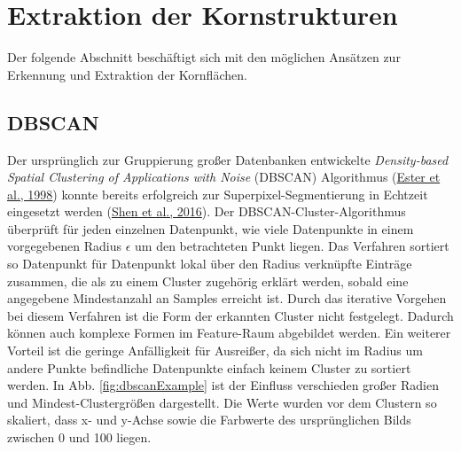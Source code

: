 \documentclass[
  12pt,
  openany]{book}
\begin{document}
\hypertarget{extraktion-der-kornstrukturen}{%
\section{Extraktion der Kornstrukturen}\label{extraktion-der-kornstrukturen}}

Der folgende Abschnitt beschäftigt sich mit den möglichen Ansätzen zur Erkennung und Extraktion der Kornflächen.

\hypertarget{dbscan}{%
\subsection{DBSCAN}\label{dbscan}}

Der ursprünglich zur Gruppierung großer Datenbanken entwickelte \emph{Density-based Spatial Clustering of Applications with Noise} (DBSCAN) Algorithmus (\protect\hyperlink{ref-esterIncrementalClusteringMining1998}{Ester et al., 1998}) konnte bereits erfolgreich zur Superpixel-Segmentierung in Echtzeit eingesetzt werden (\protect\hyperlink{ref-shenRealTimeSuperpixelSegmentation2016}{Shen et al., 2016}).
Der DBSCAN-Cluster-Algorithmus überprüft für jeden einzelnen Datenpunkt, wie viele Datenpunkte in einem vorgegebenen Radius \(\epsilon\) um den betrachteten Punkt liegen. Das Verfahren sortiert so Datenpunkt für Datenpunkt lokal über den Radius verknüpfte Einträge zusammen, die als zu einem Cluster zugehörig erklärt werden, sobald eine angegebene Mindestanzahl an Samples erreicht ist.
Durch das iterative Vorgehen bei diesem Verfahren ist die Form der erkannten Cluster nicht festgelegt. Dadurch können auch komplexe Formen im Feature-Raum abgebildet werden. Ein weiterer Vorteil ist die geringe Anfälligkeit für Ausreißer, da sich nicht im Radius um andere Punkte befindliche Datenpunkte einfach keinem Cluster zu sortiert werden. \newline
In Abb. \ref{fig:dbscanExample} ist der Einfluss verschieden großer Radien und Mindest-Clustergrößen dargestellt. Die Werte wurden vor dem Clustern so skaliert, dass x- und y-Achse sowie die Farbwerte des ursprünglichen Bilds zwischen 0 und 100 liegen.
\end{document}
